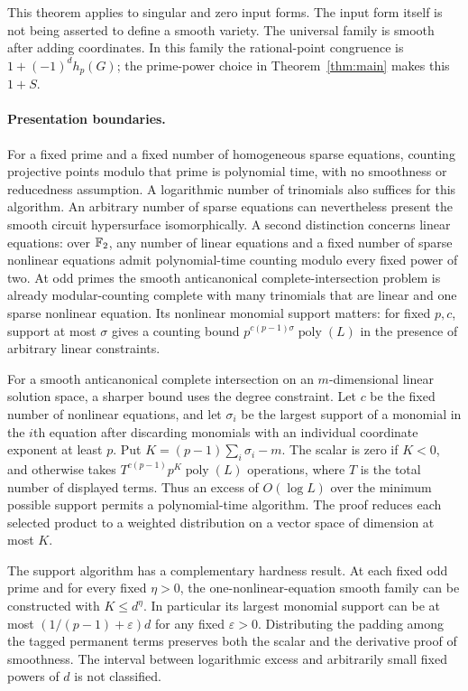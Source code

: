 This theorem applies to singular and zero input forms. The input form itself is not being asserted to define a smooth variety. The universal family is smooth after adding coordinates. In this family the rational-point congruence is $1+(-1)^d h_p(G)$; the prime-power choice in Theorem~\ref{thm:main} makes this $1+S$.



\paragraph{Presentation boundaries.}
For a fixed prime and a fixed number of homogeneous sparse equations, counting projective points modulo that prime is polynomial time, with no smoothness or reducedness assumption. A logarithmic number of trinomials also suffices for this algorithm. An arbitrary number of sparse equations can nevertheless present the smooth circuit hypersurface isomorphically. A second distinction concerns linear equations: over $\mathbb F_2$, any number of linear equations and a fixed number of sparse nonlinear equations admit polynomial-time counting modulo every fixed power of two. At odd primes the smooth anticanonical complete-intersection problem is already modular-counting complete with many trinomials that are linear and one sparse nonlinear equation. Its nonlinear monomial support matters: for fixed $p,c$, support at most $\sigma$ gives a counting bound $p^{c(p-1)\sigma}\operatorname{poly}(L)$ in the presence of arbitrary linear constraints.

For a smooth anticanonical complete intersection on an $m$-dimensional linear solution space, a sharper bound uses the degree constraint. Let $c$ be the fixed number of nonlinear equations, and let $\sigma_i$ be the largest support of a monomial in the $i$th equation after discarding monomials with an individual coordinate exponent at least $p$. Put $K=(p-1)\sum_i\sigma_i-m$. The scalar is zero if $K<0$, and otherwise takes $T^{c(p-1)}p^K\operatorname{poly}(L)$ operations, where $T$ is the total number of displayed terms. Thus an excess of $O(\log L)$ over the minimum possible support permits a polynomial-time algorithm. The proof reduces each selected product to a weighted distribution on a vector space of dimension at most $K$.

The support algorithm has a complementary hardness result. At each fixed odd prime and for every fixed $\eta>0$, the one-nonlinear-equation smooth family can be constructed with $K\le d^\eta$. In particular its largest monomial support can be at most $(1/(p-1)+\varepsilon)d$ for any fixed $\varepsilon>0$. Distributing the padding among the tagged permanent terms preserves both the scalar and the derivative proof of smoothness. The interval between logarithmic excess and arbitrarily small fixed powers of $d$ is not classified.

